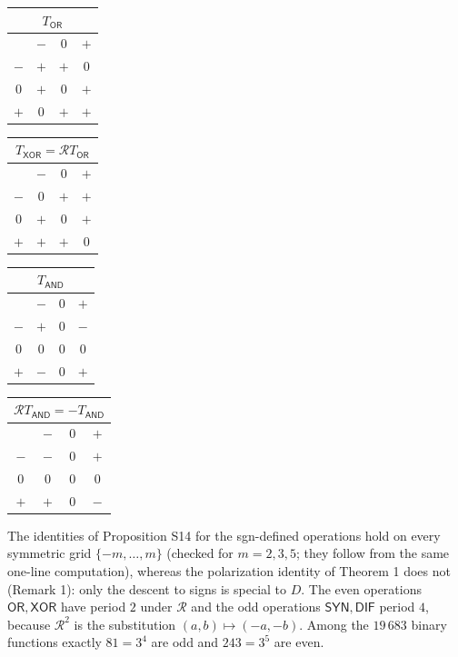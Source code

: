 \documentclass[10pt,a4paper]{article}
\newcommand{\D}{D}\newcommand{\Z}{\mathcal Z}\newcommand{\SYN}{\mathsf{SYN}}\newcommand{\DIF}{\mathsf{DIF}}\newcommand{\OR}{\mathsf{OR}}\newcommand{\XOR}{\mathsf{XOR}}\newcommand{\AND}{\mathsf{AND}}\newcommand{\NOT}{\mathsf{NOT}}\newcommand{\ANT}{\mathsf{ANT}}\newcommand{\MAX}{\mathsf{MAX}}\newcommand{\MIN}{\mathsf{MIN}}\newcommand{\MAG}{\mathsf{MAG}}\newcommand{\chai}{Chai}\newcommand{\Fone}{\mathcal F_1}\newcommand{\Ftwo}{\mathcal F_2}\usepackage{tikz}\usetikzlibrary{arrows.meta,positioning}\newcommand{\yang}{\rule{0.8em}{0.18ex}}\newcommand{\yin}{\rule{0.25em}{0.18ex}\hspace{0.3em}\rule{0.25em}{0.18ex}}\newcommand{\tri}[3]{\raisebox{-0.01ex}{\shortstack[c]{#1\\[-0.3ex]#2\\[-0.3ex]#3}}}\newcommand{\iv}[1]{[\![#1]\!]}
\begin{document}
\begin{center}\small \begin{minipage}[t]{3.1cm}\centering \begin{tabular}{c|ccc}\multicolumn{4}{c}{$T_{\mathsf{OR}}$}\\\hline &$-$&$0$&$+$\\\hline $-$&$+$&$+$&$0$\\$0$&$+$&$0$&$+$\\$+$&$0$&$+$&$+$\\\end{tabular}\end{minipage}\quad \begin{minipage}[t]{3.1cm}\centering \begin{tabular}{c|ccc}\multicolumn{4}{c}{$T_{\mathsf{XOR}}=\mathcal R T_{\mathsf{OR}}$}\\\hline &$-$&$0$&$+$\\\hline $-$&$0$&$+$&$+$\\$0$&$+$&$0$&$+$\\$+$&$+$&$+$&$0$\\\end{tabular}\end{minipage}\quad \begin{minipage}[t]{3.1cm}\centering \begin{tabular}{c|ccc}\multicolumn{4}{c}{$T_{\mathsf{AND}}$}\\\hline &$-$&$0$&$+$\\\hline $-$&$+$&$0$&$-$\\$0$&$0$&$0$&$0$\\$+$&$-$&$0$&$+$\\\end{tabular}\end{minipage}\quad \begin{minipage}[t]{3.1cm}\centering \begin{tabular}{c|ccc}\multicolumn{4}{c}{$\mathcal R T_{\mathsf{AND}}=-T_{\mathsf{AND}}$}\\\hline &$-$&$0$&$+$\\\hline $-$&$-$&$0$&$+$\\$0$&$0$&$0$&$0$\\$+$&$+$&$0$&$-$\\\end{tabular}\end{minipage}\end{center}
The identities of Proposition S14 for the sgn-defined operations hold on every symmetric grid $\{-m,\dots,m\}$ (checked for $m=2,3,5$; they follow from the same one-line computation), whereas the polarization identity of Theorem 1 does not (Remark 1): only the descent to signs is special to $\D$. The even operations $\mathsf{OR},\mathsf{XOR}$ have period $2$ under $\mathcal R$ and the odd operations $\mathsf{SYN},\mathsf{DIF}$ period $4$, because $\mathcal R^2$ is the substitution $(a,b)\mapsto(-a,-b)$. Among the $19\,683$ binary functions exactly $81=3^4$ are odd and $243=3^5$ are even.
\end{document}
